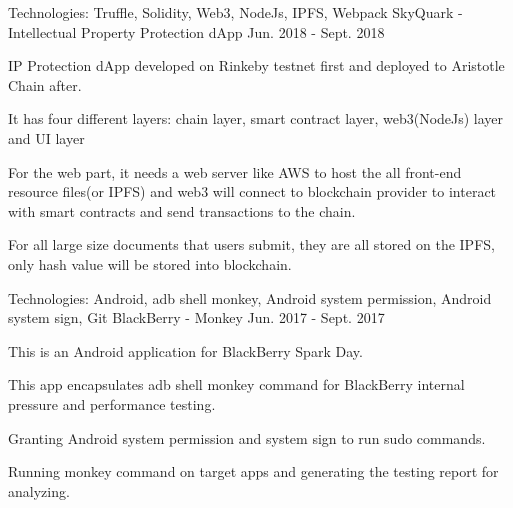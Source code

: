 \begin{cventries}

 
  \cventry
    {Technologies: \quad Truffle, Solidity, Web3, NodeJs, IPFS, Webpack
    }
    {SkyQuark - Intellectual Property Protection dApp}
    {}
    {Jun. 2018 - Sept. 2018}
    {
      \begin{cvitems}
        \item {IP Protection dApp developed on Rinkeby testnet first and deployed to Aristotle Chain after.}
        \item {It has four different layers: chain layer, smart contract layer, web3(NodeJs) layer and UI layer}
        \item {For the web part, it needs a web server like AWS to host the all front-end resource files(or IPFS) and web3 will connect to blockchain provider to interact with smart contracts and send transactions to the chain.}
        \item {For all large size documents that users submit, they are all stored on the IPFS, only hash value will be stored into blockchain.}
      \end{cvitems}
    }

  \cventry
    {Technologies: \quad Android, adb shell monkey, Android system permission, Android system sign, Git}
    {BlackBerry - Monkey}
    {}
    {Jun. 2017 - Sept. 2017}
    {
      \begin{cvitems}
        \item {This is an Android application for BlackBerry Spark Day.}
        \item {This app encapsulates adb shell monkey command for BlackBerry internal pressure and performance testing.}
        \item {Granting Android system permission and system sign to run sudo commands.}
        \item {Running monkey command on target apps and generating the testing report for analyzing.}
      \end{cvitems}
    }
  

\end{cventries}
